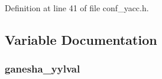 Definition at line 41 of file conf\_\-yacc.h.

\subsection{Variable Documentation}
\subsubsection[{ganesha\_\-yylval}]{ {\bf ganesha\_\-yylval}}\label{conf__yacc_8h_13be7405b90f437bb0c72233b2a8c587}


